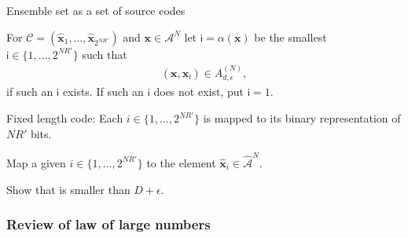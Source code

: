 \begin{frame}{Ensemble set as a set of source codes} 
\bit
\item[] 
\bit
\item For $\mathcal{C}=({\hat{\mathbf{x}}}_1,\dots,{\hat{\mathbf{x}}}_{2^{NR'}})$ and $\mathbf{x}\in\mathcal{A}^N$ let 
$\mathsf{i}=\alpha(\mathbf{x})$ be the smallest $\mathsf{i}\in\{1,\dots,2^{NR'}\}$ such that 
\begin{align*}
(\mathbf{x},{\hat{\mathbf{x}}}_{\mathsf{i}})\in A_{d,\epsilon}^{(N)}, 
\end{align*}
if such an $\mathsf{i}$ exists. If such an $\mathsf{i}$ does not exist, put $\mathsf{i}=1$. 
\eit
\item[] 
\bit 
\item Fixed length code: Each $i\in\{1,\dots,2^{NR'}\}$ is mapped to its binary representation of $NR'$ bits. 
\eit 
\item[] 
\bit 
\item Map a given $i\in\{1,\dots,2^{NR'}\}$ to the element ${\hat{\mathbf{x}}}_i\in{\hat{\mathcal{A}}}^N$. 
\eit
\eit
\bit
\item[\iarrow] 
\item[\iarrow] 
\item[\iarrow] Show that  is smaller than $D+\epsilon$.
\eit
\end{frame}

\subsubsection{Review of law of large numbers}

